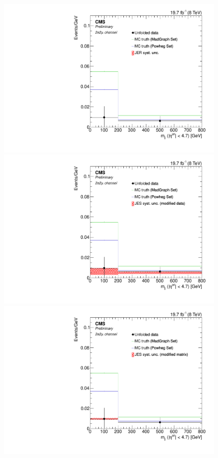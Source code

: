 \begin{figure}[hbtp]
\begin{center}
    \includegraphics[width=0.8\cmsFigWidth]{Figures/Unfolding/Systematics/ZZTo2e2m_Mjj_JER_Mad_fr}
    \includegraphics[width=0.8\cmsFigWidth]{Figures/Unfolding/Systematics/ZZTo2e2m_Mjj_JES_ModData_Mad_fr}     
    \includegraphics[width=0.8\cmsFigWidth]{Figures/Unfolding/Systematics/ZZTo2e2m_Mjj_JES_ModMat_Mad_fr}

\end{center}
\end{figure}
